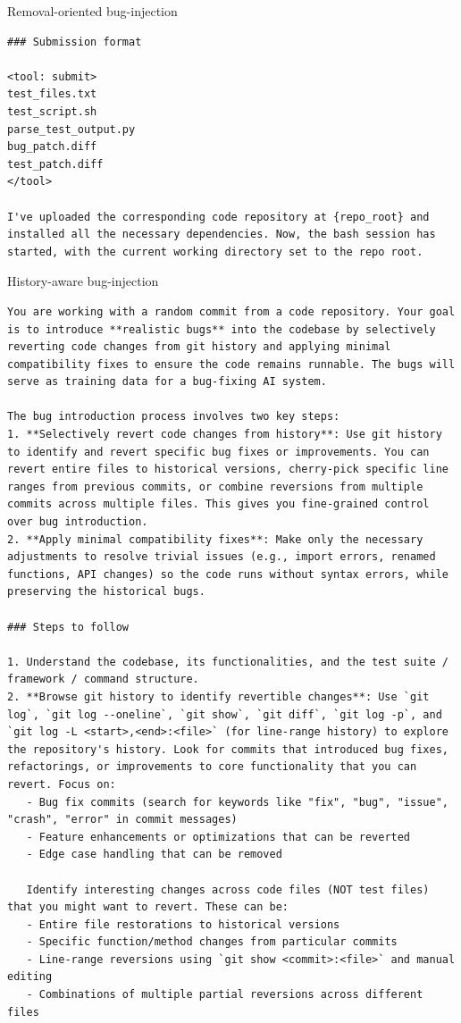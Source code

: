 \begin{promptbox}{Removal-oriented bug-injection}
\begin{Verbatim}[breaklines=true]
### Submission format

<tool: submit>
test_files.txt
test_script.sh
parse_test_output.py
bug_patch.diff
test_patch.diff
</tool>

I've uploaded the corresponding code repository at {repo_root} and installed all the necessary dependencies. Now, the bash session has started, with the current working directory set to the repo root. 
\end{Verbatim}
\end{promptbox}

\begin{promptbox}{History-aware bug-injection}
\begin{Verbatim}[breaklines=true]
You are working with a random commit from a code repository. Your goal is to introduce **realistic bugs** into the codebase by selectively reverting code changes from git history and applying minimal compatibility fixes to ensure the code remains runnable. The bugs will serve as training data for a bug-fixing AI system.

The bug introduction process involves two key steps:
1. **Selectively revert code changes from history**: Use git history to identify and revert specific bug fixes or improvements. You can revert entire files to historical versions, cherry-pick specific line ranges from previous commits, or combine reversions from multiple commits across multiple files. This gives you fine-grained control over bug introduction.
2. **Apply minimal compatibility fixes**: Make only the necessary adjustments to resolve trivial issues (e.g., import errors, renamed functions, API changes) so the code runs without syntax errors, while preserving the historical bugs.

### Steps to follow

1. Understand the codebase, its functionalities, and the test suite / framework / command structure.
2. **Browse git history to identify revertible changes**: Use `git log`, `git log --oneline`, `git show`, `git diff`, `git log -p`, and `git log -L <start>,<end>:<file>` (for line-range history) to explore the repository's history. Look for commits that introduced bug fixes, refactorings, or improvements to core functionality that you can revert. Focus on:
   - Bug fix commits (search for keywords like "fix", "bug", "issue", "crash", "error" in commit messages)
   - Feature enhancements or optimizations that can be reverted
   - Edge case handling that can be removed

   Identify interesting changes across code files (NOT test files) that you might want to revert. These can be:
   - Entire file restorations to historical versions
   - Specific function/method changes from particular commits
   - Line-range reversions using `git show <commit>:<file>` and manual editing
   - Combinations of multiple partial reversions across different files


\end{Verbatim}
\end{promptbox}
